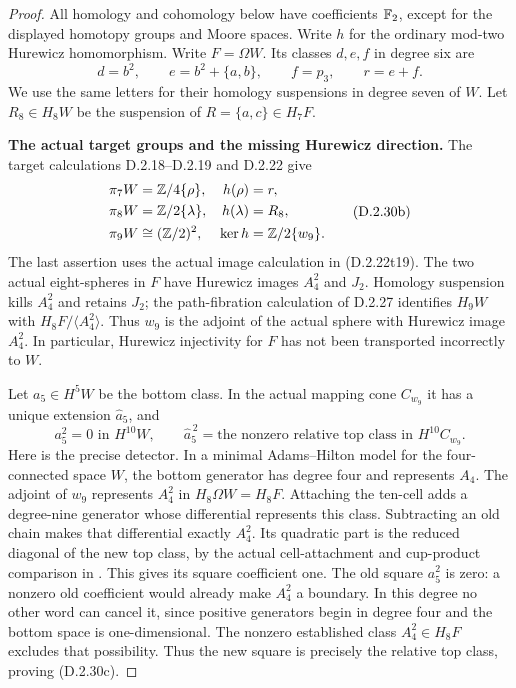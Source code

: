 \begin{proof}
All homology and cohomology below have coefficients $\mathbb F_2$,
except for the displayed homotopy groups and Moore spaces.
Write $h$ for the ordinary mod-two Hurewicz homomorphism.
Write $F=\Omega W$. Its classes $d,e,f$ in degree six are
\[
 d=b^2,\qquad e=b^2+\{a,b\},\qquad f=p_3,
 \qquad r=e+f.
\]
We use the same letters for their homology suspensions in
degree seven of $W$. Let $R_8\in H_8W$ be the suspension
of $R=\{a,c\}\in H_7F$.

\medskip\noindent
\textbf{The actual target groups and the missing Hurewicz direction.}
The target calculations D.2.18--D.2.19 and D.2.22 give
\[
 \begin{aligned}
 \pi_7W&=\mathbb Z/4\{\rho\},& h(\rho)&=r,\\
 \pi_8W&=\mathbb Z/2\{\lambda\},& h(\lambda)&=R_8,\\
 \pi_9W&\cong(\mathbb Z/2)^2,&\ker h
       &=\mathbb Z/2\{w_9\}.
 \end{aligned}
 \tag{D.2.30b}
\]
The last assertion uses the actual image calculation in
\textup{(D.2.22t19)}. The two actual eight-spheres in $F$
have Hurewicz images $A_4^2$ and $J_2$.
Homology suspension kills $A_4^2$ and retains $J_2$;
the path-fibration calculation of D.2.27 identifies
$H_9W$ with $H_8F/\langle A_4^2\rangle$.
Thus $w_9$ is the adjoint of the actual sphere with
Hurewicz image $A_4^2$. In particular, Hurewicz injectivity
for $F$ has not been transported incorrectly to $W$.

Let $a_5\in H^5W$ be the bottom class. In the actual
mapping cone $C_{w_9}$ it has a unique extension
$\widehat a_5$, and
\[
 a_5^2=0\text{ in }H^{10}W,
 \qquad
 \widehat a_5^{\,2}=\text{the nonzero relative top class}
       \text{ in }H^{10}C_{w_9}.
 \tag{D.2.30c}
\]
Here is the precise detector. In a minimal Adams--Hilton
model for the four-connected space $W$, the bottom
generator has degree four and represents $A_4$.
The adjoint of $w_9$ represents $A_4^2$ in
$H_8\Omega W=H_8F$. Attaching the ten-cell adds a
degree-nine generator whose differential represents this
class. Subtracting an old chain makes that differential
exactly $A_4^2$. Its quadratic part is the reduced diagonal
of the new top class, by the actual cell-attachment and
cup-product comparison in
\cite[\S3.1, p.~300]{FGHHalperinLemaire1995}.
This gives its square coefficient one.
The old square $a_5^2$ is zero: a nonzero old coefficient
would already make $A_4^2$ a boundary. In this degree no
other word can cancel it, since positive generators begin
in degree four and the bottom space is one-dimensional.
The nonzero established class $A_4^2\in H_8F$ excludes
that possibility. Thus the new square is precisely the
relative top class, proving \textup{(D.2.30c)}.


\end{proof}
